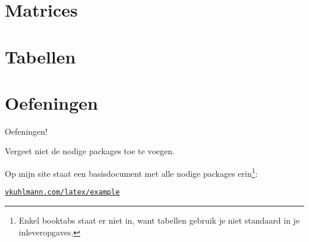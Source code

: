 \documentclass[
    dutch,
    everyoneauthor=true,
    defaultSlideCollection=vincent,
]{../../cursuspresentatie}
\let\placetarget\relax
\let\placetarget\relax
\begin{document}
\def\placetarget{\hypertarget{figuren}{}}


\section{Matrices}\label{sec:matrices}

\def\placetarget{\hypertarget{matrices}{}}



\section{Tabellen}\label{sec:tabellen}

\def\placetarget{\hypertarget{tabellen}{}}



\section{Oefeningen}\label{sec:oefeningen2}

\def\placetarget{\hypertarget{oefeningen2}{}}

\begin{frame}
    \begin{center}
        {\LARGE Oefeningen!}
        \vspace{30pt}

        Vergeet niet de nodige packages toe te voegen.
        
        Op mijn site
        staat een basisdocument met alle nodige packages erin\footnote{Enkel
        booktabs staat er niet in, want tabellen gebruik je niet standaard in je
        inleveropgaves.}:

        \href{https://vkuhlmann.com/latex/example}{\nolinkurl{vkuhlmann.com/latex/example}}
    \end{center}
\end{frame}
\end{document}
